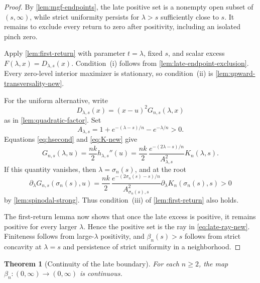 \documentclass[11pt]{article}
\theoremstyle{plain}
\newtheorem{theorem}{Theorem}[section]
\theoremstyle{definition}
\theoremstyle{remark}
\begin{document}
\begin{proof}
By \cref{lem:mgf-endpoints}, the late positive set is a nonempty open subset of \((s,\infty)\), while strict uniformity persists for \(\lambda>s\) sufficiently close to \(s\).  It remains to exclude every return to zero after positivity, including an isolated pinch zero.

Apply \cref{lem:first-return} with parameter \(t=\lambda\), fixed \(s\), and scalar excess \(F(\lambda,x)=D_{\lambda,s}(x)\).  Condition~\textup{(i)} follows from \cref{lem:late-endpoint-exclusion}.  Every zero-level interior maximizer is stationary, so condition~\textup{(ii)} is \cref{lem:upward-transversality-new}.

For the uniform alternative, write
\[
D_{\lambda,s}(x)=(x-u)^2G_{n,s}(\lambda,x)
\]
as in \cref{lem:quadratic-factor}.  Set
\[
A_{\lambda,s}=1+e^{-(\lambda-s)/n}-e^{-\lambda/n}>0.
\]
Equations \eqref{eq:hsecond} and \eqref{eq:K-new} give
\begin{equation}\label{eq:late-G-uniform}
G_{n,s}(\lambda,u)
=\frac{nk}{2}h_{\lambda,s}''(u)
=\frac{nk}{2}\,
\frac{e^{-(2\lambda-s)/n}}{A_{\lambda,s}^2}
K_n(\lambda,s).
\end{equation}
If this quantity vanishes, then \(\lambda=\sigma_n(s)\), and at the root
\begin{equation}\label{eq:late-G-orientation}
\partial_\lambda G_{n,s}(\sigma_n(s),u)
=\frac{nk}{2}\,
\frac{e^{-(2\sigma_n(s)-s)/n}}{A_{\sigma_n(s),s}^2}
\partial_\lambda K_n(\sigma_n(s),s)>0
\end{equation}
by \cref{lem:spinodal-strong}.  Thus condition~\textup{(iii)} of \cref{lem:first-return} also holds.

The first-return lemma now shows that once the late excess is positive, it remains positive for every larger \(\lambda\).  Hence the positive set is the ray in \eqref{eq:late-ray-new}.  Finiteness follows from large-\(\lambda\) positivity, and \(\beta_n(s)>s\) follows from strict concavity at \(\lambda=s\) and persistence of strict uniformity in a neighborhood.
\end{proof}

\begin{theorem}[Continuity of the late boundary]\label{thm:beta-cont-new}
For each \(n\ge2\), the map \(\beta_n:(0,\infty)\to(0,\infty)\) is continuous.
\end{theorem}
\end{document}
